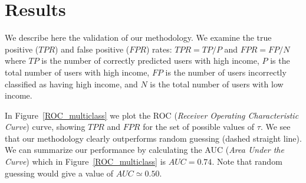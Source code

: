 \section{Results}





We describe here the validation of our methodology. 
We examine the true positive ($TPR$) and false positive ($FPR$) rates: $TPR=TP/P$ and $FPR=FP/N$ where $TP$ is the number of correctly predicted users with high income, $P$ is the total number of users with high income, $FP$ is the number of users incorrectly classified as having high income, and $N$ is the total number of users with low income. 

In Figure~\ref{ROC_multiclass} we plot the ROC (\textit{Receiver Operating Characteristic Curve}) curve, showing $TPR$ and $FPR$ for the set of possible values of $\tau$. We see that our methodology clearly outperforms random guessing (dashed straight line). We can summarize our performance by calculating  the AUC (\textit{Area Under the Curve}) which in Figure~\ref{ROC_multiclass} is $AUC = 0.74$. Note that random guessing would give a value of $AUC \simeq 0.50$.


%

